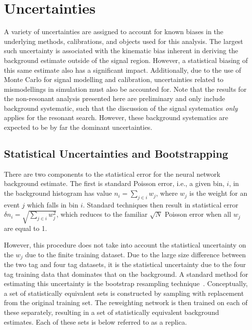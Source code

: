 


\FloatBarrier
\clearpage
\section{Uncertainties}
\label{sec:systematics}
A variety of uncertainties are assigned to account for known biases in the
underlying methods, calibrations, and objects used for this analysis. The
largest such uncertainty is associated with the kinematic bias inherent in
deriving the background estimate outside of the signal region. However, a
statistical biasing of this same estimate also has a significant impact.
Additionally, due to the use of Monte Carlo for signal modelling and \btag
calibration, uncertainties related to mismodellings in simulation must also be
accounted for. Note that the results for the non-resonant analysis presented here are 
preliminary and only include background systematic, such that the discussion of the 
signal systematics \emph{only} applies for the resonant search. However, these background 
systematics are expected to be by far the dominant uncertainties.

\subsection{Statistical Uncertainties and Bootstrapping}
There are two components to the statistical error for the neural network
background estimate. The first is standard Poisson error, i.e., a given bin,
$i$, in the background histogram has value $n_i = \sum\limits_{j\in i} w_j$,
where $w_j$ is the weight for an event $j$ which falls in bin $i$. Standard
techniques then result in statistical error $\delta n_i =
	\sqrt{\sum\limits_{j\in i} w_j^2}$, which reduces to the familiar $\sqrt{N}$
Poisson error when all $w_j$ are equal to 1.

However, this procedure does not take into account the statistical uncertainty
on the $w_j$ due to the finite training dataset. Due to the large size
difference between the two tag and four tag datasets, it is the statistical
uncertainty due to the four tag training data that dominates that on the
background. A standard method for estimating this uncertainty is the bootstrap
resampling technique~\cite{Bootstrap}. Conceptually, a set of statistically
equivalent sets is constructed by sampling with replacement from the original
training set. The reweighting network is then trained on each of these
separately, resulting in a set of statistically equivalent background estimates.
Each of these sets is below referred to as a replica.

